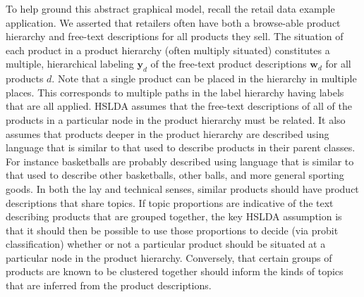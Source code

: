 
To help ground this abstract graphical model, recall the 
retail data example application. We asserted that  retailers often have both a browse-able product hierarchy and
free-text descriptions for all products they sell. The situation of each
product in a product hierarchy (often multiply situated) constitutes a
multiple, hierarchical labeling $\mathbf{y}_d$ of the free-text product descriptions  $\mathbf{w}_d$ for all products $d.$     Note that a single product can be placed in the hierarchy in multiple places.  This corresponds to multiple paths in the label hierarchy having labels that are all applied.  HSLDA assumes that the free-text descriptions of all of the products in a particular node in the product hierarchy must be related.  It also assumes that products deeper in the product hierarchy are  described using language that is similar to that used to describe products in their parent classes.  For instance basketballs are probably described using language that is similar to that used to describe other basketballs, other balls, and more general sporting goods.   In both the lay and technical senses, similar products should have product descriptions that share topics.   If topic proportions are indicative of the text describing products that are grouped together, the key HSLDA assumption is that it should then be possible to use those proportions to decide (via probit classification) whether or not a particular product should be situated at a particular node in the product hierarchy.  Conversely, that certain groups of products are known to be clustered together should inform the kinds of topics that are inferred from the product descriptions.





%
%


